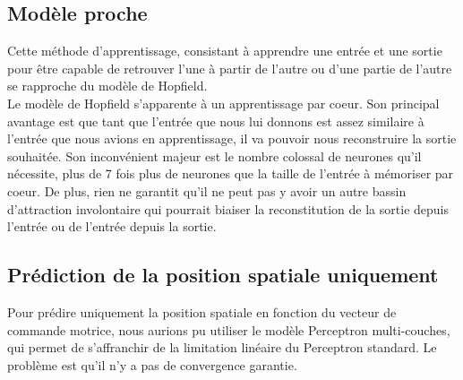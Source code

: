 \documentclass{article}
\begin{document}
\subsection{Modèle proche}
Cette méthode d'apprentissage, consistant à apprendre une entrée et une sortie pour être capable de retrouver l'une à partir de l'autre ou d'une partie de l'autre se rapproche du modèle de Hopfield.\\
Le modèle de Hopfield s'apparente à un apprentissage par coeur. Son principal avantage est que tant que l'entrée que nous lui donnons est assez similaire à l'entrée que nous avions en apprentissage, il va pouvoir nous reconstruire la sortie souhaitée. Son inconvénient majeur est le nombre colossal de neurones qu'il nécessite, plus de 7 fois plus de neurones que la taille de l'entrée à mémoriser par coeur. De plus, rien ne garantit qu'il ne peut pas y avoir un autre bassin d'attraction involontaire qui pourrait biaiser la reconstitution de la sortie depuis l'entrée ou de l'entrée depuis la sortie.

\subsection{Prédiction de la position spatiale uniquement}
Pour prédire uniquement la position spatiale en fonction du vecteur de commande motrice, nous aurions pu utiliser le modèle Perceptron multi-couches, qui permet de s'affranchir de la limitation linéaire du Perceptron standard. Le problème est qu'il n'y a pas de convergence garantie.
\end{document}
